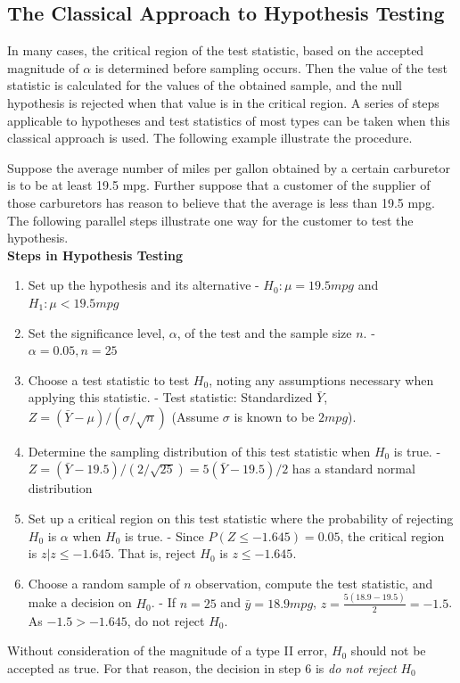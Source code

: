 \documentclass{WileySev}
\newcommand{\myexample}[2]{
    \begin{tcolorbox}[enhanced,colback=black!5!white,colframe=black,sharp corners,title={Example: #1}]#2
    \end{tcolorbox}
}
\begin{document}
\subsection{The Classical Approach to Hypothesis Testing}

In many cases, the critical region of the test statistic, based on the accepted magnitude of $\alpha$ is determined before sampling occurs. Then the value of the test statistic is calculated for the values of the obtained sample, and the null hypothesis is rejected when that value is in the critical region. A series of steps applicable to hypotheses and test statistics of most types can be taken when this classical approach is used. The following example illustrate the procedure.
\\
\myexample{Classical Approach to Hypothesis Testing}{Suppose the average number of miles per gallon obtained by a certain carburetor is to be at least 19.5 mpg. Further suppose that a customer of the supplier of those carburetors has reason to believe that the average is less than 19.5 mpg. The following parallel steps illustrate one way for the customer to test the hypothesis.
\\
\textbf{Steps in Hypothesis Testing}
\begin{enumerate}
	\item Set up the hypothesis and its alternative - $H_0:\mu = 19.5 mpg$ and $H_1:\mu < 19.5 mpg$
	\item Set the significance level, $\alpha$, of the test and the sample size $n$. - $\alpha = 0.05, n = 25$
	\item Choose a test statistic to test $H_0$, noting any assumptions necessary when applying this statistic. - Test statistic: Standardized $\bar{Y}$, $Z=(\bar{Y}-\mu)/(\sigma/\sqrt{n})$ (Assume $\sigma$ is known to be $2 mpg$).
	\item Determine the sampling distribution of this test statistic when $H_0$ is true. - $Z=(\bar{Y}-19.5)/(2/\sqrt{25}) = 5(\bar{Y}-19.5)/2$ has a standard normal distribution
	\item Set up a critical region on this test statistic where the probability of rejecting $H_0$ is $\alpha$ when $H_0$ is true. - Since $P(Z \leq -1.645) = 0.05$, the critical region is ${z|z \leq -1.645}$. That is, reject $H_0$ is $z \leq -1.645$.
	\item Choose a random sample of $n$ observation, compute the test statistic, and make a decision on $H_0$. - If $n = 25$ and $\bar{y} = 18.9mpg$,
	$z=\frac{5(18.9-19.5)}{2}=-1.5$. As $-1.5 > -1.645$, do not reject $H_0$.
\end{enumerate}
Without consideration of the magnitude of a type II error, $H_0$ should not be accepted as true. For that reason, the decision in step 6 is \textit{do not reject} $H_0$}
\end{document}
